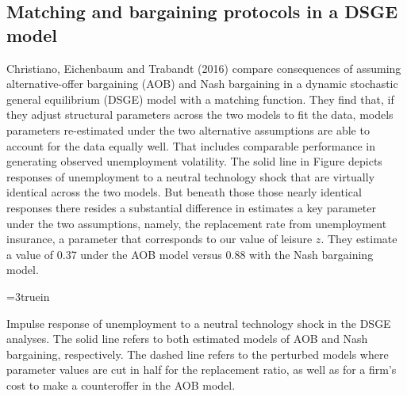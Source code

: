 \subsection{Matching and bargaining protocols in a  DSGE model}
Christiano, Eichenbaum and Trabandt (2016) compare consequences
of assuming
alternative-offer bargaining (AOB) and Nash bargaining
in a dynamic stochastic general equilibrium (DSGE)
model with a matching function. They find that,  if they adjust structural parameters across the two models  to  fit the  data,
 models parameters re-estimated under   the two alternative assumptions are  able to account for
the data equally well. That  includes comparable performance in   generating observed  unemployment volatility. 
The solid line in Figure 
depicts responses of unemployment to a neutral technology
shock that are virtually identical across the two models.
But  beneath those those nearly identical responses there resides  a substantial difference in estimates a key parameter under
the two assumptions, namely,
the replacement rate from unemployment insurance, a parameter that
corresponds to our value of leisure $z$. They estimate a value of  0.37 under the AOB
model versus 0.88 with the Nash bargaining model.


\centerline{\epsfxsize=3truein}
\caption{Impulse response of unemployment to a neutral
technology shock in the DSGE analyses. The solid line refers
to both estimated models of AOB and Nash bargaining,
respectively. The
dashed line refers to the perturbed models where parameter
values are cut in half for the replacement ratio, as well as
for a firm's cost to make a counteroffer in the AOB model.}
\endfigure


